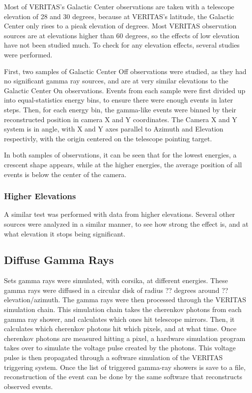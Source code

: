 Most of VERITAS's Galactic Center observations are taken with a telescope elevation of 28 and 30 degrees, because at VERITAS's latitude, the Galactic Center only rises to a pieak elevation of  degrees.
Most VERITAS observation sources are at elevations higher than 60 degrees, so the effects of low elevation have not been studied much.
To check for any elevation effects, several studies were performed.

First, two samples of Galactic Center Off observations were studied, as they had no significant gamma ray sources, and are at very similar elevations to the Galactic Center On observations.
Events from each sample were first divided up into equal-statistics energy bins, to ensure there were enough events in later steps.
Then, for each energy bin, the gamma-like events were binned by their reconstructed position in camera X and Y coordinates.
The Camera X and Y system is in angle, with X and Y axes parallel to Azimuth and Elevation respectivly, with the origin centered on the telescope pointing target.

In both samples of observations, it can be seen that for the lowest energies, a crescent shape appears, while at the higher energies, the average position of all events is below the center of the camera.


\subsubsection{Higher Elevations}
A similar test was performed with data from higher elevations.
Several other sources were analyzed in a similar manner, to see how strong the effect is, and at what elevation it stops being significant.


\subsection{Diffuse Gamma Rays}

Sets gamma rays were simulated, with corsika, at different energies.
These gamma rays were diffused in a circular disk of radius ?? degrees around ?? elevation/azimuth.
The gamma rays were then processed through the VERITAS simulation chain.
This simulation chain takes the cherenkov photons from each gamma ray shower, and calculates which ones hit telescope mirrors.
Then, it calculates which cherenkov photons hit which pixels, and at what time.
Once cherenkov photons are measured hitting a pixel, a hardware simulation program takes over to simulate the voltage pulse created by the photons.
This voltage pulse is then propagated through a software simulation of the VERITAS triggering system.
Once the list of triggered gamma-ray showers is save to a file, reconstruction of the event can be done by the same software that reconstructs observed events.

